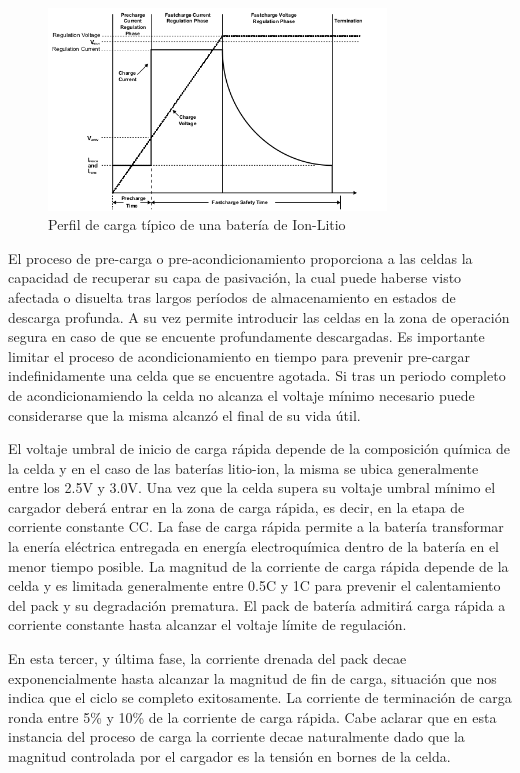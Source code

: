 \documentclass[10pt,a4paper]{article}
\begin{document}
\begin{figure}[h!] \centering
    \includegraphics[width=0.8\textwidth]{bat_char/char_profile.png}
    \caption{Perfil de carga típico de una batería de Ion-Litio}
\label{fig:char_prof} \end{figure} \FloatBarrier

El proceso de pre-carga o pre-acondicionamiento proporciona a las celdas la
capacidad de recuperar su capa de pasivación, la cual puede haberse visto
afectada o disuelta tras largos per\'iodos de almacenamiento en estados de
descarga profunda. A su vez permite introducir las celdas en la zona de
operación segura en caso de que se encuente profundamente descargadas. Es
importante limitar el proceso de acondicionamiento en tiempo para prevenir 
pre-cargar indefinidamente una celda que se encuentre agotada. Si tras un 
periodo completo de acondicionamiendo la celda no alcanza el voltaje mínimo 
necesario puede considerarse que la misma alcanzó el final de su vida útil.

El voltaje umbral de inicio de carga rápida depende de la composici\'on
qu\'imica de la celda y en el caso de las baterías litio-ion, la misma 
se ubica generalmente entre los 2.5V y 3.0V. Una vez que la celda supera su 
voltaje umbral mínimo el cargador deber\'a entrar en la zona de carga rápida, es
decir, en la etapa de corriente constante \acrshort{CC}. La fase de carga rápida 
permite a la batería transformar la enería eléctrica entregada en energía 
electroquímica dentro de la batería en el menor tiempo posible. La magnitud de 
la corriente de carga rápida depende de la celda y es limitada generalmente 
entre 0.5C y 1C para prevenir el calentamiento del pack y su degradación 
prematura. El pack de batería admitirá carga rápida a corriente constante hasta 
alcanzar el voltaje límite de regulación. 

En esta tercer, y última fase, la corriente drenada del pack decae
exponencialmente hasta alcanzar la magnitud de fin de carga, situación que nos
indica que el ciclo se completo exitosamente. La corriente de terminación de
carga ronda entre 5\% y 10\% de la corriente de carga rápida. Cabe aclarar
que en esta instancia del proceso de carga la corriente decae naturalmente dado
que la magnitud controlada por el cargador es la tensi\'on en bornes de la
celda.  
\end{document}

